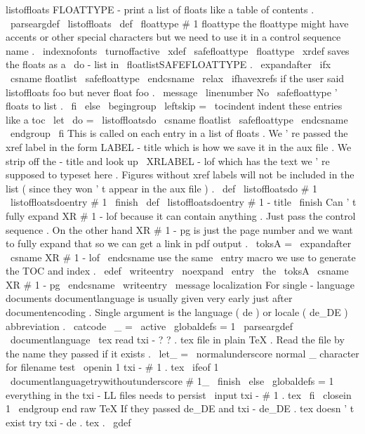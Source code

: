 {{{{{}
%
listoffloats
FLOATTYPE
-
print
a
list
of
floats
like
a
table
of
contents
.
%
\
parseargdef
\
listoffloats
{
%
\
def
\
floattype
{
#
1
}
%
floattype
{
%
%
the
floattype
might
have
accents
or
other
special
characters
%
but
we
need
to
use
it
in
a
control
sequence
name
.
\
indexnofonts
\
turnoffactive
\
xdef
\
safefloattype
{
\
floattype
}
%
}
%
%
%
\
xrdef
saves
the
floats
as
a
\
do
-
list
in
\
floatlistSAFEFLOATTYPE
.
\
expandafter
\
ifx
\
csname
floatlist
\
safefloattype
\
endcsname
\
relax
\
ifhavexrefs
%
if
the
user
said
listoffloats
foo
but
never
float
foo
.
\
message
{
\
linenumber
No
\
safefloattype
'
floats
to
list
.
}
%
\
fi
\
else
\
begingroup
\
leftskip
=
\
tocindent
%
indent
these
entries
like
a
toc
\
let
\
do
=
\
listoffloatsdo
\
csname
floatlist
\
safefloattype
\
endcsname
\
endgroup
\
fi
}
%
This
is
called
on
each
entry
in
a
list
of
floats
.
We
'
re
passed
the
%
xref
label
in
the
form
LABEL
-
title
which
is
how
we
save
it
in
the
%
aux
file
.
We
strip
off
the
-
title
and
look
up
\
XRLABEL
-
lof
which
%
has
the
text
we
'
re
supposed
to
typeset
here
.
%
%
Figures
without
xref
labels
will
not
be
included
in
the
list
(
since
%
they
won
'
t
appear
in
the
aux
file
)
.
%
\
def
\
listoffloatsdo
#
1
{
\
listoffloatsdoentry
#
1
\
finish
}
\
def
\
listoffloatsdoentry
#
1
-
title
\
finish
{
{
%
%
Can
'
t
fully
expand
XR
#
1
-
lof
because
it
can
contain
anything
.
Just
%
pass
the
control
sequence
.
On
the
other
hand
XR
#
1
-
pg
is
just
the
%
page
number
and
we
want
to
fully
expand
that
so
we
can
get
a
link
%
in
pdf
output
.
\
toksA
=
\
expandafter
{
\
csname
XR
#
1
-
lof
\
endcsname
}
%
%
%
use
the
same
\
entry
macro
we
use
to
generate
the
TOC
and
index
.
\
edef
\
writeentry
{
\
noexpand
\
entry
{
\
the
\
toksA
}
{
\
csname
XR
#
1
-
pg
\
endcsname
}
}
%
\
writeentry
}
}
\
message
{
localization
}
%
For
single
-
language
documents
documentlanguage
is
usually
given
very
%
early
just
after
documentencoding
.
Single
argument
is
the
language
%
(
de
)
or
locale
(
de_DE
)
abbreviation
.
%
{
\
catcode
\
_
=
\
active
\
globaldefs
=
1
\
parseargdef
\
documentlanguage
{
%
\
tex
%
read
txi
-
?
?
.
tex
file
in
plain
TeX
.
%
Read
the
file
by
the
name
they
passed
if
it
exists
.
\
let_
=
\
normalunderscore
%
normal
_
character
for
filename
test
\
openin
1
txi
-
#
1
.
tex
\
ifeof
1
\
documentlanguagetrywithoutunderscore
#
1_
\
finish
\
else
\
globaldefs
=
1
%
everything
in
the
txi
-
LL
files
needs
to
persist
\
input
txi
-
#
1
.
tex
\
fi
\
closein
1
\
endgroup
%
end
raw
TeX
}
%
%
If
they
passed
de_DE
and
txi
-
de_DE
.
tex
doesn
'
t
exist
%
try
txi
-
de
.
tex
.
%
\
gdef
}}}}}
